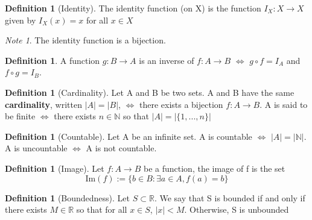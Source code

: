 \documentclass[12pt]{article}
\theoremstyle{definition}
\newtheorem{defn}[thm]{Definition}
\theoremstyle{remark}
\newtheorem*{note}{Note} %
\numberwithin{equation}{section}
\newcommand\R{\mathbb R}    %
\newcommand\N{\mathbb N}    %
\begin{document}
\begin{defn}[Identity]
        The identity function (on X) is the function $I_X:X \rightarrow X$ given by $I_X(x) = x$ for all $x \in X$
\end{defn}


\begin{note}
        The identity function is a bijection.
\end{note}



\begin{defn}
        A function $g:B \rightarrow A$ is an inverse of $f:A \rightarrow B$ $\iff$ $g\circ f = I_A$ and $f\circ g= I_B$.
\end{defn}



\begin{defn}[Cardinality]
        Let A and B be two sets. A and B have the same \textbf{cardinality}, written $|A| = |B|$, $\iff$ there exists a bijection $f:A\rightarrow B$. A is said to be finite $\iff$ there exists $n \in \N$ so that $|A| = |\{1,...,n\}|$
\end{defn}


\begin{defn}[Countable]
        Let A be an infinite set. A is countable $\iff$ $|A| = |\N|$. A is uncountable $\iff$ A is not countable.
\end{defn}



\begin{defn}[Image]
        Let $f:A \rightarrow B$ be a function, the image of f is the set $$\text{Im}(f) := \{b \in B: \exists a \in A, f(a) = b\}$$
\end{defn}


\begin{defn}[Boundedness]
        Let $S \subset \R$. We say that S is bounded if and only if there exists $M \in \R$ so that for all $x \in S$, $|x| < M$. Otherwise, S is unbounded
\end{defn}
\end{document}
